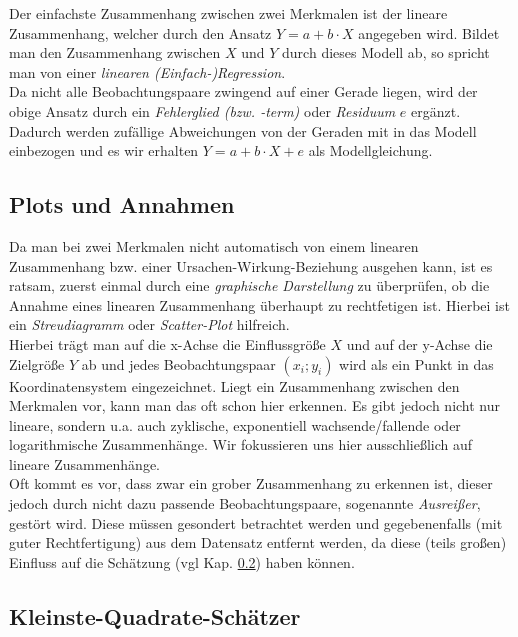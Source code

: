 \documentclass[a4paper]{article}
\begin{document}
\noindent Der einfachste Zusammenhang zwischen zwei Merkmalen ist der lineare Zusammenhang, welcher durch den Ansatz $Y=a+b \cdot X$ angegeben wird. Bildet man den Zusammenhang zwischen $X$ und $Y$ durch dieses Modell ab, so spricht man von einer \textit{linearen (Einfach-)Regression}.\\
Da nicht alle Beobachtungspaare zwingend auf einer Gerade liegen, wird der obige Ansatz durch ein \textit{Fehlerglied (bzw. -term)} oder \textit{Residuum} $e$ ergänzt. Dadurch werden zufällige Abweichungen von der Geraden mit in das Modell einbezogen und es wir erhalten $Y=a+b \cdot X+e$ als Modellgleichung.

\subsection{Plots und Annahmen}\label{sec:scatter}
Da man bei zwei Merkmalen nicht automatisch von einem linearen Zusammenhang bzw. einer Ursachen-Wirkung-Beziehung ausgehen kann, ist es ratsam, zuerst einmal durch eine \textit{graphische Darstellung} zu überprüfen, ob die Annahme eines linearen Zusammenhang überhaupt zu rechtfetigen ist. Hierbei ist ein \textit{Streudiagramm} oder \textit{Scatter-Plot} hilfreich.\\
Hierbei trägt man auf die x-Achse die Einflussgröße $X$ und auf der y-Achse die Zielgröße $Y$ ab und jedes Beobachtungspaar $(x_i;y_i)$ wird als ein Punkt in das Koordinatensystem eingezeichnet. Liegt ein Zusammenhang zwischen den Merkmalen vor, kann man das oft schon hier erkennen. Es gibt jedoch nicht nur lineare, sondern u.a. auch zyklische, exponentiell wachsende/fallende oder logarithmische Zusammenhänge. Wir fokussieren uns hier ausschließlich auf lineare Zusammenhänge.\\
Oft kommt es vor, dass zwar ein grober Zusammenhang zu erkennen ist, dieser jedoch durch nicht dazu passende Beobachtungspaare, sogenannte \textit{Ausreißer}, gestört wird. Diese müssen gesondert betrachtet werden und gegebenenfalls (mit guter Rechtfertigung) aus dem Datensatz entfernt werden, da diese (teils großen) Einfluss auf die Schätzung (vgl Kap. \ref{sec:kq}) haben können.\\

\noindent {}

\subsection{Kleinste-Quadrate-Schätzer}\label{sec:kq}
\end{document}
